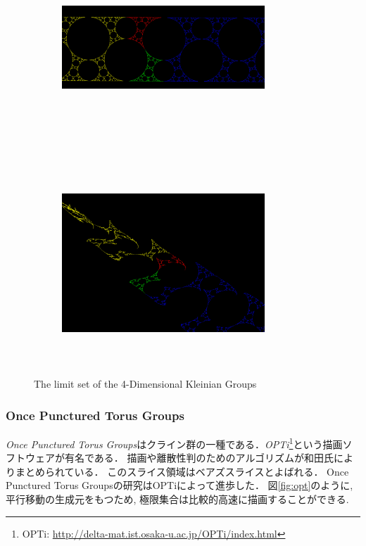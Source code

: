 \begin{figure}[h!tbp]
 \begin{subfigure}{0.49\hsize}
   \begin{center}
    \includegraphics[width=3in, height=3in, keepaspectratio]{../img/klein/sakugawa1.pdf}
    \caption{}
    \label{fig:sakugawa1}
   \end{center}
 \end{subfigure}
 \hspace*{\fill}
 \begin{subfigure}{0.49\hsize}
   \begin{center}
    \includegraphics[width=3in, height=3in, keepaspectratio]{../img/klein/sakugawa2.pdf}
    \caption{}
    \label{fig:sakugawa2}
   \end{center}
 \end{subfigure}
 \caption{The limit set of the 4-Dimensional Kleinian Groups}
 \label{fig:sakugawa}
\end{figure}

\subsubsection{Once Punctured Torus Groups}
{\it Once Punctured Torus Groups}はクライン群の一種である．{\it OPTi}\footnote{OPTi: \url{http://delta-mat.ist.osaka-u.ac.jp/OPTi/index.html}}という描画ソフトウェアが有名である．
描画\cite{OPTiDrawing}や離散性判\cite{OPTiDiscrete}のためのアルゴリズムが和田氏によりまとめられている．
このスライス領域はベアズスライスとよばれる．
Once Punctured Torus Groupsの研究はOPTiによって進歩した．
図\ref{fig:opt}のように, 平行移動の生成元をもつため, 極限集合は比較的高速に描画することができる.

